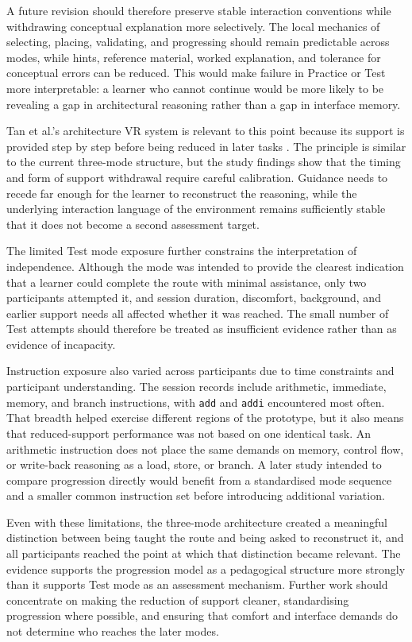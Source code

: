 A future revision should therefore preserve stable interaction conventions while withdrawing conceptual explanation more selectively. The local mechanics of selecting, placing, validating, and progressing should remain predictable across modes, while hints, reference material, worked explanation, and tolerance for conceptual errors can be reduced. This would make failure in Practice or Test more interpretable: a learner who cannot continue would be more likely to be revealing a gap in architectural reasoning rather than a gap in interface memory.

Tan et al.'s architecture VR system is relevant to this point because its support is provided step by step before being reduced in later tasks \cite{tan2023vr}. The principle is similar to the current three-mode structure, but the study findings show that the timing and form of support withdrawal require careful calibration. Guidance needs to recede far enough for the learner to reconstruct the reasoning, while the underlying interaction language of the environment remains sufficiently stable that it does not become a second assessment target.

The limited Test mode exposure further constrains the interpretation of independence. Although the mode was intended to provide the clearest indication that a learner could complete the route with minimal assistance, only two participants attempted it, and session duration, discomfort, background, and earlier support needs all affected whether it was reached. The small number of Test attempts should therefore be treated as insufficient evidence rather than as evidence of incapacity.


Instruction exposure also varied across participants due to time constraints and participant understanding. The session records include arithmetic, immediate, memory, and branch instructions, with \texttt{add} and \texttt{addi} encountered most often. That breadth helped exercise different regions of the prototype, but it also means that reduced-support performance was not based on one identical task. An arithmetic instruction does not place the same demands on memory, control flow, or write-back reasoning as a load, store, or branch. A later study intended to compare progression directly would benefit from a standardised mode sequence and a smaller common instruction set before introducing additional variation.

Even with these limitations, the three-mode architecture created a meaningful distinction between being taught the route and being asked to reconstruct it, and all participants reached the point at which that distinction became relevant. The evidence supports the progression model as a pedagogical structure more strongly than it supports Test mode as an assessment mechanism. Further work should concentrate on making the reduction of support cleaner, standardising progression where possible, and ensuring that comfort and interface demands do not determine who reaches the later modes.


